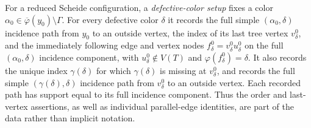\begin{definition}
For a reduced Scheide configuration, a \emph{defective-color setup} fixes
a color $\alpha_0\in\overline\varphi(y_0)\setminus\Gamma$.  For every
defective color $\delta$ it records the full simple
$(\alpha_0,\delta)$ incidence path from $y_0$ to an outside vertex, the
index of its last tree vertex $v^0_\delta$, and the immediately following
edge and vertex nodes
$f^0_\delta=v^0_\delta u^0_\delta$ on the full
$(\alpha_0,\delta)$ incidence component, with
$u^0_\delta\notin V(T)$ and $\varphi(f^0_\delta)=\delta$.  It also records
the unique index $\gamma(\delta)$ for which
$\gamma(\delta)$ is missing at $v^0_\delta$, and records the full simple
$(\gamma(\delta),\delta)$ incidence path from $v^0_\delta$ to an outside
vertex.  Each recorded path has support equal to its full incidence
component.  Thus the order and last-vertex assertions, as well as individual
parallel-edge identities, are part of the data rather than implicit
notation.
\end{definition}
